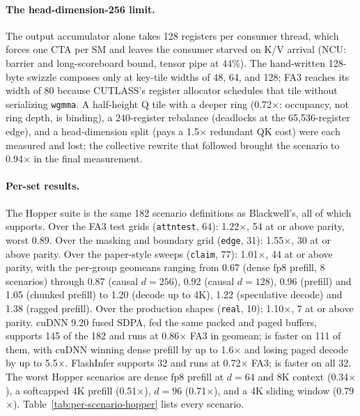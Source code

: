 \paragraph{The head-dimension-256 limit.} The output accumulator alone takes 128 registers per
consumer thread, which forces one CTA per SM and leaves the consumer starved on K/V arrival (NCU:
barrier and long-scoreboard bound, tensor pipe at 44\%). The hand-written 128-byte swizzle composes
only at key-tile widths of 48, 64, and 128; FA3 reaches its width of 80 because CUTLASS's register
allocator schedules that tile without serializing \texttt{wgmma}. A half-height Q tile with a deeper
ring (0.72$\times$: occupancy, not ring depth, is binding), a 240-register rebalance (deadlocks at the
65,536-register edge), and a head-dimension split (pays a 1.5$\times$ redundant QK cost) were each
measured and lost; the collective rewrite that followed brought the scenario to 0.94$\times$ in the
final measurement.

\paragraph{Per-set results.} The Hopper suite is the same 182 scenario definitions as Blackwell's,
all of which \fathree supports. Over the FA3 test grids (\texttt{attntest}, 64): 1.22$\times$, 54 at
or above parity, worst 0.89. Over the masking and boundary grid (\texttt{edge}, 31): 1.55$\times$,
30 at or above parity. Over the paper-style sweeps (\texttt{claim}, 77): 1.01$\times$, 44 at or above
parity, with the per-group geomeans ranging from 0.67 (dense fp8 prefill, 8 scenarios) through 0.87
(causal $d=256$), 0.92 (causal $d=128$), 0.96 (prefill) and 1.05 (chunked prefill) to 1.20 (decode up
to 4K), 1.22 (speculative decode) and 1.38 (ragged prefill). Over the production shapes
(\texttt{real}, 10): 1.10$\times$, 7 at or above parity. cuDNN 9.20 fused SDPA, fed the same packed
and paged buffers, supports 145 of the 182 and runs at 0.86$\times$ FA3 in geomean; \fathree is faster
on 111 of them, with cuDNN winning dense prefill by up to 1.6$\times$ and losing paged decode by up to
5.5$\times$. FlashInfer supports 32 and runs at 0.72$\times$ FA3; \fathree is faster on all 32. The
worst Hopper scenarios are dense fp8 prefill at $d=64$ and 8K context (0.34$\times$), a softcapped
4K prefill (0.51$\times$), $d=96$ (0.71$\times$), and a 4K sliding window (0.79$\times$).
Table~\ref{tab:per-scenario-hopper} lists every scenario.

